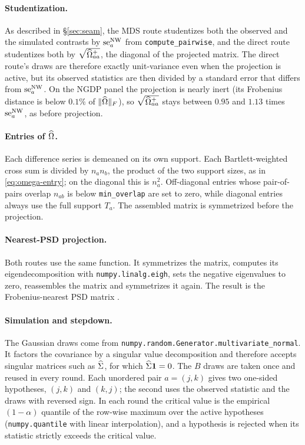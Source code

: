 \begin{appendix}
\paragraph{Studentization.} As described in \S\ref{sec:seam}, the MDS route
studentizes both the observed and the simulated contrasts by $\mathrm{se}^{\mathrm{NW}}_{a}$ from
\texttt{compute\_pairwise}, and the direct route studentizes both by
$\sqrt{\widehat{\Omega}^{+}_{aa}}$, the diagonal of the projected matrix. The direct route's
draws are therefore exactly unit-variance even when the projection is active, but its
observed statistics are then divided by a standard error that differs from $\mathrm{se}^{\mathrm{NW}}_{a}$.
On the NGDP panel the projection is nearly inert (its Frobenius distance is below
$0.1\%$ of $\lVert \widehat{\Omega} \rVert_{F}$), so $\sqrt{\widehat{\Omega}^{+}_{aa}}$ stays between $0.95$ and
$1.13$ times $\mathrm{se}^{\mathrm{NW}}_{a}$, as before projection.

\paragraph{Entries of $\widehat{\Omega}$.} Each difference series is demeaned on its own
support. Each Bartlett-weighted cross sum is divided by $n_a n_b$, the product of the
two support sizes, as in \eqref{eq:omega-entry}; on the diagonal this is $n_a^2$.
Off-diagonal entries whose pair-of-pairs overlap $n_{ab}$ is below
\texttt{min\_overlap} are set to zero, while diagonal entries always use the full
support $T_a$. The assembled matrix is symmetrized before the projection.

\paragraph{Nearest-PSD projection.} Both routes use the same function. It
symmetrizes the matrix, computes its eigendecomposition with
\texttt{numpy.linalg.eigh}, sets the negative eigenvalues to zero, reassembles the
matrix and symmetrizes it again. The result is the Frobenius-nearest PSD matrix
\citep{higham1988}.

\paragraph{Simulation and stepdown.} The Gaussian draws come from
\texttt{numpy.random.\allowbreak Generator.\allowbreak multivariate\_normal}. It factors the covariance by a
singular value decomposition and therefore accepts singular matrices such as $\widehat{\Sigma}$,
for which $\widehat{\Sigma}\mathbf{1}=0$. The $B$ draws are taken once and reused in every round. Each
unordered pair $a=(j,k)$ gives two one-sided hypotheses, $(j,k)$ and $(k,j)$; the
second uses the observed statistic and the draws with reversed sign. In each round the
critical value is the empirical $(1-\alpha)$ quantile of the row-wise maximum over the
active hypotheses (\texttt{numpy.quantile} with linear interpolation), and a
hypothesis is rejected when its statistic strictly exceeds the critical value.


\end{appendix}
